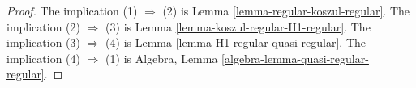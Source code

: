 \documentclass[10pt,a4paper]{amsart}
\theoremstyle{plain}
\theoremstyle{definition}
\theoremstyle{remark}
\numberwithin{equation}{subsection}
\begin{document}
\begin{proof}
The implication (1) $\Rightarrow$ (2) is 
Lemma \ref{lemma-regular-koszul-regular}.
The implication (2) $\Rightarrow$ (3) is
Lemma \ref{lemma-koszul-regular-H1-regular}.
The implication (3) $\Rightarrow$ (4) is 
Lemma \ref{lemma-H1-regular-quasi-regular}.
The implication (4) $\Rightarrow$ (1) is
Algebra, Lemma \ref{algebra-lemma-quasi-regular-regular}.
\end{proof}
\end{document}
